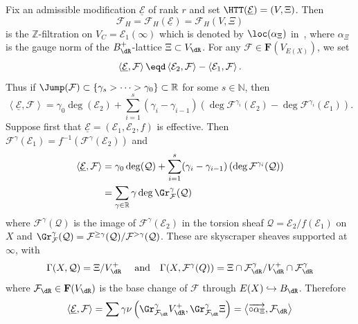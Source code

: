 \subsubsection{}

Fix an admissible modification $\underline{\mathcal{E}}$ of rank $r$ and set $\HTT(\underline{\mathcal{E}})=\left(V,\Xi\right)$. Then
\[
\mathcal{F}_{H}=\mathcal{F}_{H}(\underline{\mathcal{E}})=\mathcal{F}_{H}(V,\Xi)
\]
is the $\mathbb{Z}$-filtration on $V_{C}=\mathcal{E}_{1}(\infty)$ which is denoted by $\loc(\alpha_{\Xi})$ in~\cite[6.4]{Co16}, where $\alpha_{\Xi}$ is the gauge norm of the $B_{\dR}^{+}$-lattice $\Xi\subset V_{\dR}$. For any $\mathcal{F}\in\mathbf{F}(V_{E(X)})$, we set
\[
\left\langle \underline{\mathcal{E}},\mathcal{F}\right\rangle \eqd\left\langle \mathcal{E}_{2},\mathcal{F}\right\rangle -\left\langle \mathcal{E}_{1},\mathcal{F}\right\rangle.
\]
Thus if $\Jump(\mathcal{F})\subset\{\gamma_{s}>\dots>\gamma_{0}\}\subset\mathbb{R}$ for some $s\in\mathbb{N}$, then
\[
\left\langle \underline{\mathcal{E}},\mathcal{F}\right\rangle =\gamma_{0}\deg(\mathcal{E}_{2})+\sum_{i=1}^{s}(\gamma_{i}-\gamma_{i-1})\left(\deg\mathcal{F}^{\gamma_{i}}(\mathcal{E}_{2})-\deg\mathcal{F}^{\gamma_{i}}(\mathcal{E}_{1})\right).
\]
Suppose first that $\underline{\mathcal{E}}=(\mathcal{E}_{1},\mathcal{E}_{2},f)$ is effective. Then $\mathcal{F}^{\gamma}(\mathcal{E}_{1})=f^{-1}(\mathcal{F}^{\gamma}(\mathcal{E}_{2}))$ and
\begin{align*}
\left\langle \underline{\mathcal{E}},\mathcal{F}\right\rangle & = \gamma_{0}\deg(\mathcal{Q})+\sum_{i=1}^{s}(\gamma_{i}-\gamma_{i-1})\left(\deg\mathcal{F}^{\gamma_{i}}(\mathcal{Q})\right)\\
& = \sum_{\gamma\in\mathbb{R}}\gamma\deg\Gr_{\mathcal{F}}^{\gamma}(\mathcal{Q})
\end{align*}
where $\mathcal{F}^{\gamma}(\mathcal{Q})$ is the image of $\mathcal{F}^{\gamma}(\mathcal{E}_{2})$ in the torsion sheaf $\mathcal{Q}=\mathcal{E}_{2}/f(\mathcal{E}_{1})$ on $X$ and $\Gr_{\mathcal{F}}^{\gamma}(\mathcal{Q})=\mathcal{F}^{\geq\gamma}(\mathcal{Q})/\mathcal{F}^{>\gamma}(\mathcal{Q})$. These are skyscraper sheaves supported at $\infty$, with
\[
\Gamma(X,\mathcal{Q})=\Xi/V_{\dR}^{+}\quad\text{ and}\quad\Gamma(X,\mathcal{F}^{\gamma}(Q))=\Xi\cap\mathcal{F}_{\dR}^{\gamma}/V_{\dR}^{+}\cap\mathcal{F}_{\dR}^{\gamma}
\]
where $\mathcal{F}_{\dR}\in\mathbf{F}(V_{\dR})$ is the base change of $\mathcal{F}$ through $E(X)\hookrightarrow B_{\dR}$. Therefore
\[
\left\langle \underline{\mathcal{E}},\mathcal{F}\right\rangle =\sum\gamma\nu\left(\Gr_{\mathcal{F}_{\dR}}^{\gamma}V_{\dR}^{+},\Gr_{\mathcal{F}_{\dR}}^{\gamma}\Xi\right)=\left\langle \overrightarrow{\circ\alpha_{\Xi}},\mathcal{F}_{\dR}\right\rangle
\]
